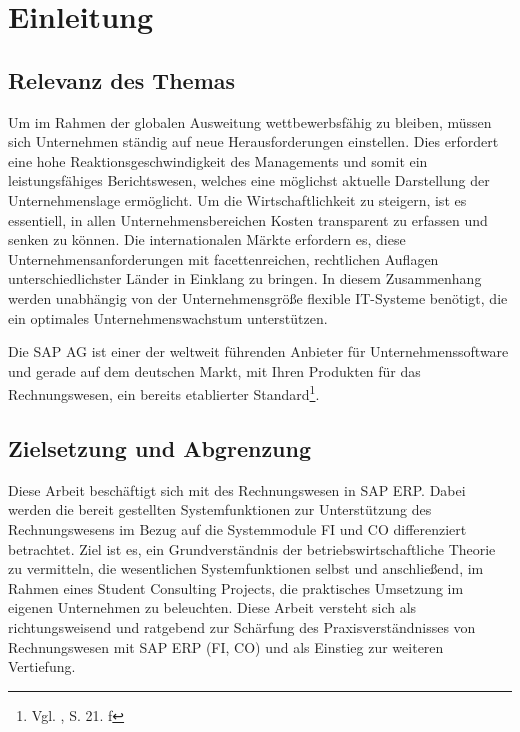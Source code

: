 \section{Einleitung}
\subsection{Relevanz des Themas}
Um im Rahmen der globalen Ausweitung wettbewerbsfähig zu bleiben, müssen sich Unternehmen ständig auf neue Herausforderungen einstellen. Dies erfordert eine hohe Reaktionsgeschwindigkeit des Managements und somit ein leistungsfähiges Berichtswesen, welches eine möglichst aktuelle Darstellung der Unternehmenslage ermöglicht. Um die Wirtschaftlichkeit zu steigern, ist es essentiell, in allen Unternehmensbereichen Kosten transparent zu erfassen und senken zu können. 
Die internationalen Märkte erfordern es, diese Unternehmensanforderungen mit facettenreichen, rechtlichen Auflagen unterschiedlichster Länder in Einklang zu bringen. 
In diesem Zusammenhang werden unabhängig von der Unternehmensgröße flexible IT-Systeme benötigt, die ein optimales Unternehmenswachstum unterstützen.

Die SAP AG ist einer der weltweit führenden Anbieter für Unternehmenssoftware und gerade auf dem deutschen Markt, mit Ihren Produkten für das Rechnungswesen, ein bereits etablierter Standard\footnote{Vgl. \cite{Patel2009}, S. 21. f}.

\subsection{Zielsetzung und Abgrenzung}
Diese Arbeit beschäftigt sich mit des Rechnungswesen in SAP ERP. Dabei werden die bereit gestellten Systemfunktionen zur Unterstützung des Rechnungswesens im Bezug auf die Systemmodule FI und CO differenziert betrachtet.
Ziel ist es, ein Grundverständnis der betriebswirtschaftliche Theorie zu vermitteln, die wesentlichen Systemfunktionen selbst und anschließend, im Rahmen eines Student Consulting Projects, die praktisches Umsetzung im eigenen Unternehmen zu beleuchten. Diese Arbeit versteht sich als richtungsweisend und ratgebend zur Schärfung des Praxisverständnisses von Rechnungswesen mit SAP ERP (FI, CO) und als Einstieg zur weiteren Vertiefung.



